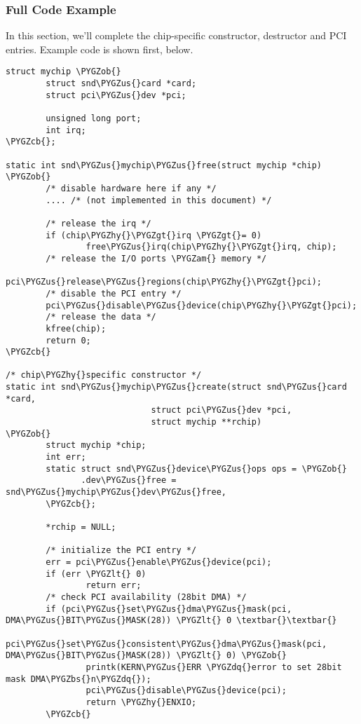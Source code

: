 \documentclass[a4paper,8pt,english]{sphinxmanual}
\def\PYGZbs{\char`\\}
\def\PYGZus{\char`\_}
\def\PYGZob{\char`\{}
\def\PYGZcb{\char`\}}
\def\PYGZam{\char`\&}
\def\PYGZlt{\char`\<}
\def\PYGZgt{\char`\>}
\def\PYGZhy{\char`\-}
\def\PYGZdq{\char`\"}
\begin{document}
\subsubsection{Full Code Example}
\label{sound/kernel-api/writing-an-alsa-driver:id1}
In this section, we'll complete the chip-specific constructor,
destructor and PCI entries. Example code is shown first, below.

\begin{Verbatim}[commandchars=\\\{\}]
struct mychip \PYGZob{}
        struct snd\PYGZus{}card *card;
        struct pci\PYGZus{}dev *pci;

        unsigned long port;
        int irq;
\PYGZcb{};

static int snd\PYGZus{}mychip\PYGZus{}free(struct mychip *chip)
\PYGZob{}
        /* disable hardware here if any */
        .... /* (not implemented in this document) */

        /* release the irq */
        if (chip\PYGZhy{}\PYGZgt{}irq \PYGZgt{}= 0)
                free\PYGZus{}irq(chip\PYGZhy{}\PYGZgt{}irq, chip);
        /* release the I/O ports \PYGZam{} memory */
        pci\PYGZus{}release\PYGZus{}regions(chip\PYGZhy{}\PYGZgt{}pci);
        /* disable the PCI entry */
        pci\PYGZus{}disable\PYGZus{}device(chip\PYGZhy{}\PYGZgt{}pci);
        /* release the data */
        kfree(chip);
        return 0;
\PYGZcb{}

/* chip\PYGZhy{}specific constructor */
static int snd\PYGZus{}mychip\PYGZus{}create(struct snd\PYGZus{}card *card,
                             struct pci\PYGZus{}dev *pci,
                             struct mychip **rchip)
\PYGZob{}
        struct mychip *chip;
        int err;
        static struct snd\PYGZus{}device\PYGZus{}ops ops = \PYGZob{}
               .dev\PYGZus{}free = snd\PYGZus{}mychip\PYGZus{}dev\PYGZus{}free,
        \PYGZcb{};

        *rchip = NULL;

        /* initialize the PCI entry */
        err = pci\PYGZus{}enable\PYGZus{}device(pci);
        if (err \PYGZlt{} 0)
                return err;
        /* check PCI availability (28bit DMA) */
        if (pci\PYGZus{}set\PYGZus{}dma\PYGZus{}mask(pci, DMA\PYGZus{}BIT\PYGZus{}MASK(28)) \PYGZlt{} 0 \textbar{}\textbar{}
            pci\PYGZus{}set\PYGZus{}consistent\PYGZus{}dma\PYGZus{}mask(pci, DMA\PYGZus{}BIT\PYGZus{}MASK(28)) \PYGZlt{} 0) \PYGZob{}
                printk(KERN\PYGZus{}ERR \PYGZdq{}error to set 28bit mask DMA\PYGZbs{}n\PYGZdq{});
                pci\PYGZus{}disable\PYGZus{}device(pci);
                return \PYGZhy{}ENXIO;
        \PYGZcb{}


\end{Verbatim}
\end{document}
